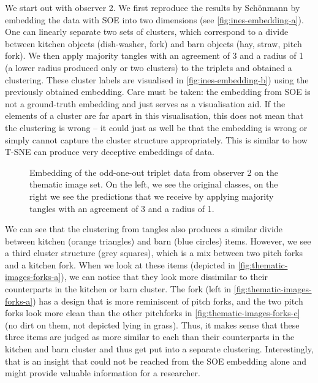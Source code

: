 We start out with observer 2. We first reproduce the results by Schönmann by embedding the data with SOE into two dimensions 
(see \autoref{fig:ines-embedding-a}). One can linearly separate two sets of clusters, which correspond to a divide between kitchen objects 
(dish-washer, fork) and barn objects (hay, straw, pitch fork).  We then apply majority tangles with an agreement of 3 and a radius of 1 (a lower radius produced only or two clusters) to the 
triplets and obtained a clustering. These cluster labels are visualised in \autoref{fig:ines-embedding-b}) using the previously obtained embedding. Care must be taken: the embedding
from SOE is not a ground-truth embedding and just serves as a visualisation aid. If the elements of a cluster are far 
apart in this visualisation, this does not mean that the clustering is wrong – it could just as well be that the embedding is wrong or simply cannot capture
the cluster structure appropriately. This is similar to how T-SNE can produce very deceptive embeddings of data.

\onecolumn
\begin{figure}[ht]
    \centering
    \caption{
        Embedding of the odd-one-out triplet data from observer 2 on the thematic image set.
        On the left, we see the original classes, on the right we see the predictions that we receive by
        applying majority tangles with an agreement of 3 and a radius of 1.
    }
    \label{fig:ines-embedding}
\end{figure}

We can see that the clustering from tangles also produces a similar divide between kitchen (orange triangles) and barn (blue circles) items. 
However, we see a third cluster structure (grey squares), which is a mix between two pitch forks and a kitchen fork. 
When we look at these items (depicted in \autoref{fig:thematic-images-forks-a}), we can notice that they look more dissimilar to their
counterparts in the kitchen or barn cluster. The fork (left in \autoref{fig:thematic-images-forks-a}) has a design that is more reminiscent of pitch forks, and the two pitch forks
look more clean than the other pitchforks in \autoref{fig:thematic-images-forks-c} (no dirt on them, not depicted lying in grass). Thus, it makes sense that these three items are judged
as more similar to each than their counterparts in the kitchen and barn cluster and thus get put into a separate clustering. Interestingly, that is an insight that could not be reached from the 
SOE embedding alone and might provide valuable information for a researcher.

